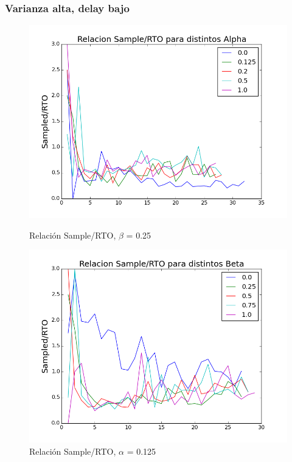 \subsubsection{Varianza alta, delay bajo}

\begin{figure}[H]
\begin{minipage}{0.5\linewidth}
\includegraphics[width=\linewidth]{../graficos/alphad01var5drop25.png}
\caption{Relación Sample/RTO, $\beta$ = 0.25}\label{fig:alpha-var5-drop25}
\end{minipage}
\hfill
\begin{minipage}{0.5\linewidth}
\includegraphics[width=\linewidth]{../graficos/betad01var5drop25.png}
\caption{Relación Sample/RTO, $\alpha$ = 0.125}\label{fig:beta-var5-drop25}
\end{minipage}
\end{figure}

